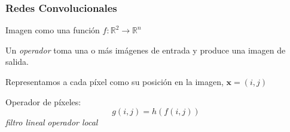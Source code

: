 \documentclass{beamer}
\begin{document}
\begin{frame}
\begin{figure}[H]
{
    }
\end{figure}
\end{frame}





\begin{frame}
\frametitle{Redes Convolucionales}
Imagen como una función \(f:\mathbb{R}^2 \to \mathbb{R}^n\) 
\vfill

Un \textit{operador} toma una o más imágenes de entrada y produce una
imagen de salida.  
\vfill
	
Representamos a cada píxel como su posición en la imagen, \(\boldsymbol{x} = (i, j)\)
\vfill
	
Operador de píxeles:
\begin{equation}
g(i,j) = h(f(i,j))
\end{equation}
\vfill
\textit{filtro lineal} \textrightarrow \textit{operador local}
\end{frame}
\end{document}
